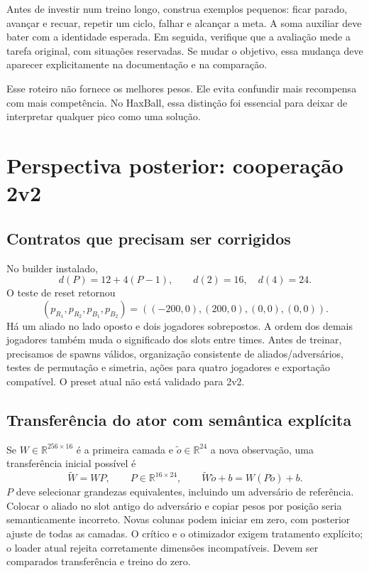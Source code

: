 \documentclass[11pt,a4paper]{article}
\newcommand{\R}{\mathbb{R}}
\begin{document}
Antes de investir num treino longo, construa exemplos pequenos: ficar parado, avançar e recuar, repetir um ciclo, falhar e alcançar a meta. A soma auxiliar deve bater com a identidade esperada. Em seguida, verifique que a avaliação mede a tarefa original, com situações reservadas. Se mudar o objetivo, essa mudança deve aparecer explicitamente na documentação e na comparação.

Esse roteiro não fornece os melhores pesos. Ele evita confundir mais recompensa com mais competência. No HaxBall, essa distinção foi essencial para deixar de interpretar qualquer pico como uma solução.

\section{Perspectiva posterior: cooperação 2v2}
\subsection{Contratos que precisam ser corrigidos}
No builder instalado,
\begin{equation}
 d(P)=12+4(P-1),\qquad d(2)=16,\quad d(4)=24.
\end{equation}
O teste de reset retornou
\begin{equation}
 (p_{R_1},p_{R_2},p_{B_1},p_{B_2})=
 ((-200,0),(200,0),(0,0),(0,0)).
\end{equation}
Há um aliado no lado oposto e dois jogadores sobrepostos. A ordem dos demais jogadores também muda o significado dos slots entre times. Antes de treinar, precisamos de spawns válidos, organização consistente de aliados/adversários, testes de permutação e simetria, ações para quatro jogadores e exportação compatível. O preset atual não está validado para 2v2.

\subsection{Transferência do ator com semântica explícita}
Se $W\in\R^{256\times16}$ é a primeira camada e $\widetilde o\in\R^{24}$ a nova observação, uma transferência inicial possível é
\begin{equation}
 \widetilde W=WP,\qquad P\in\R^{16\times24},\qquad
 \widetilde W\widetilde o+b=W(P\widetilde o)+b.
\end{equation}
$P$ deve selecionar grandezas equivalentes, incluindo um adversário de referência. Colocar o aliado no slot antigo do adversário e copiar pesos por posição seria semanticamente incorreto. Novas colunas podem iniciar em zero, com posterior ajuste de todas as camadas. O crítico e o otimizador exigem tratamento explícito; o loader atual rejeita corretamente dimensões incompatíveis. Devem ser comparados transferência e treino do zero.
\end{document}
